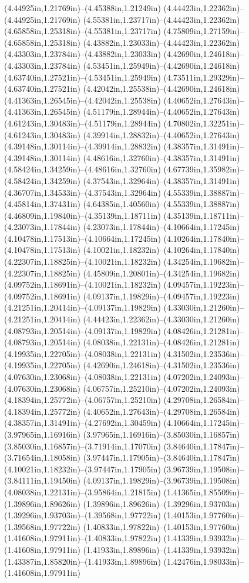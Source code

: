 (4.44925in,1.21769in)--(4.45388in,1.21249in) (4.44423in,1.22362in)--(4.44925in,1.21769in) (4.55381in,1.23717in)--(4.44423in,1.22362in) (4.65858in,1.25318in)--(4.55381in,1.23717in) (4.75809in,1.27159in)--(4.65858in,1.25318in) (4.43882in,1.23033in)--(4.44423in,1.22362in) (4.43303in,1.23784in)--(4.43882in,1.23033in) (4.42690in,1.24618in)--(4.43303in,1.23784in) (4.53451in,1.25949in)--(4.42690in,1.24618in) (4.63740in,1.27521in)--(4.53451in,1.25949in) (4.73511in,1.29329in)--(4.63740in,1.27521in) (4.42042in,1.25538in)--(4.42690in,1.24618in) (4.41363in,1.26545in)--(4.42042in,1.25538in) (4.40652in,1.27643in)--(4.41363in,1.26545in) (4.51179in,1.28944in)--(4.40652in,1.27643in) (4.61243in,1.30483in)--(4.51179in,1.28944in) (4.70802in,1.32251in)--(4.61243in,1.30483in) (4.39914in,1.28832in)--(4.40652in,1.27643in) (4.39148in,1.30114in)--(4.39914in,1.28832in) (4.38357in,1.31491in)--(4.39148in,1.30114in) (4.48616in,1.32760in)--(4.38357in,1.31491in) (4.58424in,1.34259in)--(4.48616in,1.32760in) (4.67739in,1.35982in)--(4.58424in,1.34259in) (4.37543in,1.32964in)--(4.38357in,1.31491in) (4.36707in,1.34533in)--(4.37543in,1.32964in) (4.55339in,1.38887in)--(4.45814in,1.37431in) (4.64385in,1.40560in)--(4.55339in,1.38887in) (4.46809in,1.19840in)--(4.35139in,1.18711in) (4.35139in,1.18711in)--(4.23073in,1.17844in) (4.23073in,1.17844in)--(4.10664in,1.17245in) (4.10478in,1.17513in)--(4.10664in,1.17245in) (4.10264in,1.17840in)--(4.10478in,1.17513in) (4.10021in,1.18232in)--(4.10264in,1.17840in) (4.22307in,1.18825in)--(4.10021in,1.18232in) (4.34254in,1.19682in)--(4.22307in,1.18825in) (4.45809in,1.20801in)--(4.34254in,1.19682in) (4.09752in,1.18691in)--(4.10021in,1.18232in) (4.09457in,1.19223in)--(4.09752in,1.18691in) (4.09137in,1.19829in)--(4.09457in,1.19223in) (4.21251in,1.20414in)--(4.09137in,1.19829in) (4.33030in,1.21260in)--(4.21251in,1.20414in) (4.44423in,1.22362in)--(4.33030in,1.21260in) (4.08793in,1.20514in)--(4.09137in,1.19829in) (4.08426in,1.21281in)--(4.08793in,1.20514in) (4.08038in,1.22131in)--(4.08426in,1.21281in) (4.19935in,1.22705in)--(4.08038in,1.22131in) (4.31502in,1.23536in)--(4.19935in,1.22705in) (4.42690in,1.24618in)--(4.31502in,1.23536in) (4.07630in,1.23068in)--(4.08038in,1.22131in) (4.07202in,1.24093in)--(4.07630in,1.23068in) (4.06757in,1.25210in)--(4.07202in,1.24093in) (4.18394in,1.25772in)--(4.06757in,1.25210in) (4.29708in,1.26584in)--(4.18394in,1.25772in) (4.40652in,1.27643in)--(4.29708in,1.26584in) (4.38357in,1.31491in)--(4.27692in,1.30459in) (4.10664in,1.17245in)--(3.97965in,1.16916in) (3.97965in,1.16916in)--(3.85030in,1.16857in) (3.85030in,1.16857in)--(3.71914in,1.17070in) (3.84640in,1.17847in)--(3.71654in,1.18058in) (3.97447in,1.17905in)--(3.84640in,1.17847in) (4.10021in,1.18232in)--(3.97447in,1.17905in) (3.96739in,1.19508in)--(3.84111in,1.19450in) (4.09137in,1.19829in)--(3.96739in,1.19508in) (4.08038in,1.22131in)--(3.95864in,1.21815in) (1.41365in,1.85509in)--(1.39896in,1.89626in) (1.39896in,1.89626in)--(1.39296in,1.93703in) (1.39296in,1.93703in)--(1.39568in,1.97722in) (1.40153in,1.97760in)--(1.39568in,1.97722in) (1.40833in,1.97822in)--(1.40153in,1.97760in) (1.41608in,1.97911in)--(1.40833in,1.97822in) (1.41339in,1.93932in)--(1.41608in,1.97911in) (1.41933in,1.89896in)--(1.41339in,1.93932in) (1.43387in,1.85820in)--(1.41933in,1.89896in) (1.42476in,1.98033in)--(1.41608in,1.97911in) 